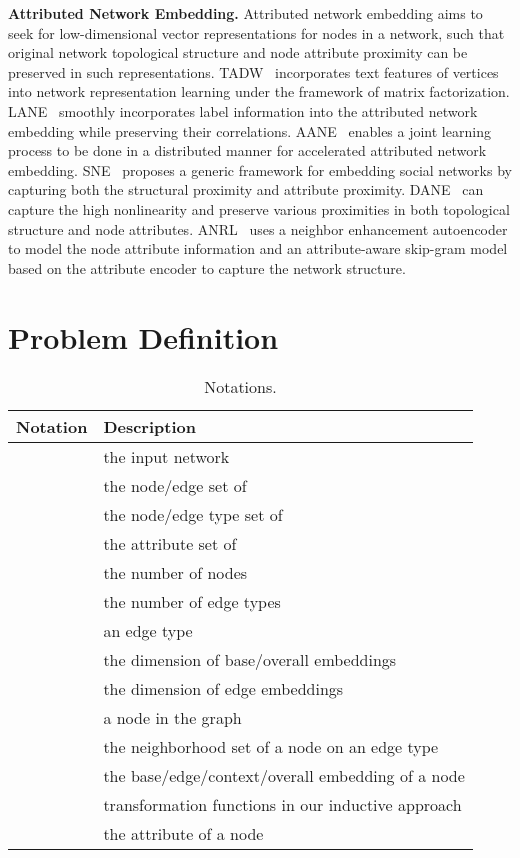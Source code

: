 \documentclass[sigconf]{acmart}
\newcommand\green[1]{\textcolor{green}{#1}}
\newcommand{\hide}[1]{} \newcommand{\jie}[1]{\textbf{\color{red}[(JT: #1 )]}}  \newcommand{\vpara}[1]{\vspace{0.07in}\noindent\textbf{#1 }}
\begin{document}
\vpara{Attributed Network Embedding.}
Attributed network embedding aims to seek for low-dimensional vector representations for nodes in a network, such that original network topological structure and node attribute proximity can be preserved in such representations. 
TADW~\cite{yang2015network} incorporates text features of vertices into network representation learning under the framework of matrix
factorization. 
LANE~\cite{huang2017label} smoothly incorporates label information into the attributed network embedding while preserving their correlations.
AANE~\cite{huang2017accelerated} enables a joint learning process to be done in a distributed manner for accelerated attributed network embedding.
SNE~\cite{liao2018attributed} proposes a generic framework for embedding social networks by capturing both the structural proximity and attribute proximity. 
DANE~\cite{gao2018deep} can capture the high nonlinearity and preserve various proximities in both topological structure and node attributes. ANRL~\cite{zhang2018anrl} uses a neighbor enhancement autoencoder to model the node attribute information and an attribute-aware skip-gram model based on the attribute encoder to capture the network structure.

  
\section{Problem Definition}\label{sec:problem}
\begin{table}
  \centering
  \caption{\label{tab:notations} Notations.\hide{\green{notation table need refine}}}
  \small
  \begin{tabular}{c|p{2.55in}}
    \hline \hline
    \textbf{Notation} & \textbf{Description} \\
    \hline
     & the input network\\
     & the node/edge set of \\
 & the node/edge type set of \\
 & the attribute set of \\
     & the number of nodes\\
     & the number of edge types\\
     & an edge type \\
     & the dimension of base/overall embeddings \\
 & the dimension of edge embeddings \\
 & a node in the graph\\
     & the neighborhood set of a node on an edge type \\
 & the base/edge/context/overall embedding of a node \\
 & transformation functions in our inductive approach \\
 & the attribute of a node\\
\hline \hline
  \end{tabular}
\end{table}
\end{document}
